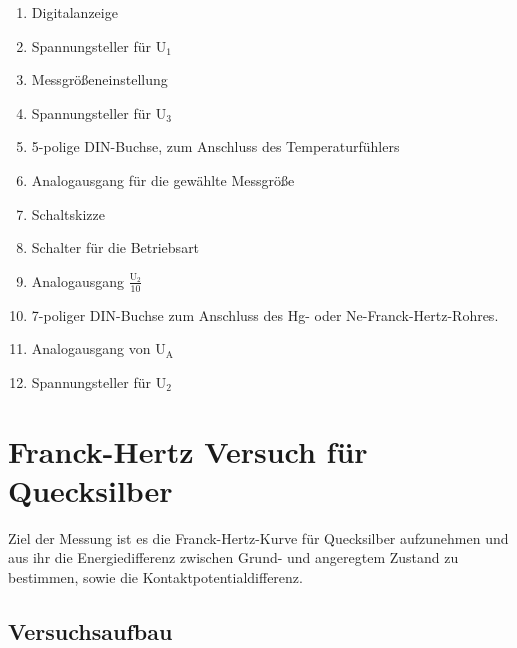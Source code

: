 \documentclass[12pt,a4paper]{article}
\begin{document}
\begin{enumerate}
\item	Digitalanzeige 

\item	Spannungsteller für U$_1$

\item	Messgrößeneinstellung

\item	Spannungsteller für U$_3$

\item	5-polige DIN-Buchse, zum Anschluss des Temperaturfühlers

\item	Analogausgang für die gewählte Messgröße

\item	Schaltskizze 

\item	Schalter für die Betriebsart

\item	Analogausgang $\frac{\text{U}_2}{10}$ 

\item	7-poliger DIN-Buchse zum Anschluss des Hg- oder Ne-Franck-Hertz-Rohres.

\item	Analogausgang von U$_\text{A}$

\item	Spannungsteller für U$_2$
\end{enumerate}

\section{Franck-Hertz Versuch für Quecksilber}
Ziel der Messung ist es die Franck-Hertz-Kurve für Quecksilber aufzunehmen und aus ihr die Energiedifferenz zwischen Grund- und angeregtem Zustand zu bestimmen, sowie die Kontaktpotentialdifferenz.

\subsection{Versuchsaufbau}
\end{document}

